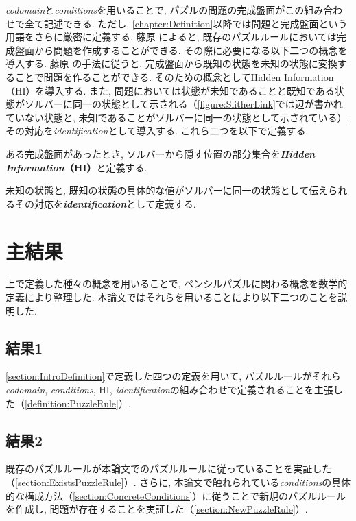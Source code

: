 \textit{codomain}と\textit{conditions}を用いることで, パズルの問題の完成盤面がこの組み合わせで全て記述できる. ただし, \cref{chapter:Definition}以降では問題と完成盤面という用語をさらに厳密に定義する. 藤原 \cite{Fujiwara2022}によると, 既存のパズルルールにおいては完成盤面から問題を作成することができる. その際に必要になる以下二つの概念を導入する. 藤原 \cite{Fujiwara2022}の手法に従うと, 完成盤面から既知の状態を未知の状態に変換することで問題を作ることができる. そのための概念としてHidden Information（HI）を導入する. また, 問題においては状態が未知であることと既知である状態がソルバーに同一の状態として示される（\cref{figure:SlitherLink}では辺が書かれていない状態と, 未知であることがソルバーに同一の状態として示されている）. その対応を\textit{identification}として導入する. これら二つを以下で定義する.
\begin{definition}
  ある完成盤面があったとき, ソルバーから隠す位置の部分集合を\textbf{\textit{Hidden Information}（HI）}と定義する.
\end{definition}
\begin{definition}
  未知の状態と, 既知の状態の具体的な値がソルバーに同一の状態として伝えられるその対応を\textbf{\textit{identification}}として定義する.
\end{definition}

\section{主結果}
上で定義した種々の概念を用いることで, ペンシルパズルに関わる概念を数学的定義により整理した. 本論文ではそれらを用いることにより以下二つのことを説明した.
\subsection*{結果1}
\cref{section:IntroDefinition}で定義した四つの定義を用いて, パズルルールがそれら\textit{codomain}, \textit{conditions}, HI, \textit{identification}の組み合わせで定義されることを主張した（\cref{definition:PuzzleRule}）.

\subsection*{結果2}
既存のパズルルールが本論文でのパズルルールに従っていることを実証した（\cref{section:ExistsPuzzleRule}）.
さらに, 本論文で触れられている\textit{conditions}の具体的な構成方法（\cref{section:ConcreteConditions}）に従うことで新規のパズルルールを作成し, 問題が存在することを実証した（\cref{section:NewPuzzleRule}）.

